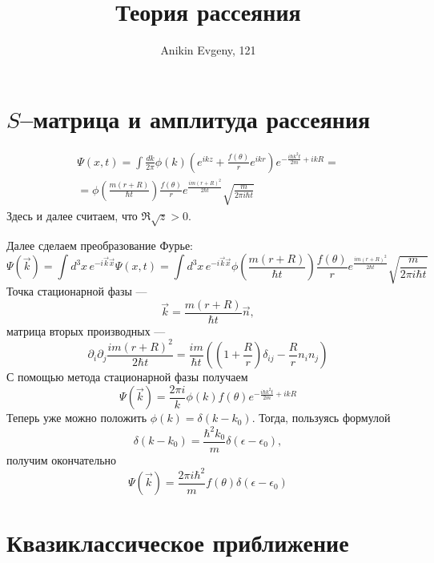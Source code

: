 \documentclass{article}
\title{Теория рассеяния}
\author{Anikin Evgeny, 121}
\begin{document}
\maketitle
\section{$S$--матрица и амплитуда рассеяния}
\begin{multline}
    \Psi(x,t) = \int \frac{dk}{2\pi} \phi(k)\left(e^{ikz} + \frac{f(\theta)}{r}e^{ikr}\right)
                e^{-\frac{i\hbar k^2t}{2m} + ikR} = \\
               = \phi\left(\frac{m(r+R)}{\hbar t}\right) \frac{f(\theta)}{r}
                e^{\frac{im(r+R)^2}{2\hbar t}} \sqrt{\frac{m}{2\pi i\hbar t}}
\end{multline}
Здесь и далее считаем, что $\Re{\sqrt{z}} > 0$.

Далее сделаем преобразование Фурье:
\begin{equation}
   \Psi(\vec{k}) = \int d^3x\, e^{-i\vec{k}\vec{x}} \Psi(x,t) = 
    \int d^3x\, e^{-i\vec{k}\vec{x}}\phi\left(\frac{m(r+R)}{\hbar t}\right) \frac{f(\theta)}{r}
                e^{\frac{im(r+R)^2}{2\hbar t}} \sqrt{\frac{m}{2\pi i\hbar t}}
\end{equation}
Точка стационарной фазы ---
\begin{equation}
    \vec{k} = \frac{m(r+R)}{\hbar t} \vec{n},
\end{equation}
матрица вторых производных ---
\begin{equation}
    \partial_i \partial_j \frac{im(r+R)^2}{2\hbar t} = \frac{im}{\hbar t} 
                \left(\left(1 + \frac{R}{r}\right)\delta_{ij} - \frac{R}{r} n_i n_j\right)
\end{equation}
С помощью метода стационарной фазы получаем
\begin{equation}
    \Psi(\vec{k}) =  \frac{2\pi i}{k} \phi(k)  f(\theta) e^{-\frac{i\hbar k^2t}{2m} + ikR}
\end{equation}
Теперь уже можно положить $\phi(k) = \delta(k - k_0)$. Тогда, пользуясь формулой 
\begin{equation}
    \delta(k - k_0) = \frac{\hbar^2 k_0}{m} \delta(\epsilon - \epsilon_0),
\end{equation}
получим окончательно
\begin{equation}
    \Psi(\vec{k}) = \frac{2\pi i \hbar^2}{m} f(\theta) \delta(\epsilon - \epsilon_0)
\end{equation}
\section{Квазиклассическое приближение}
\end{document}
